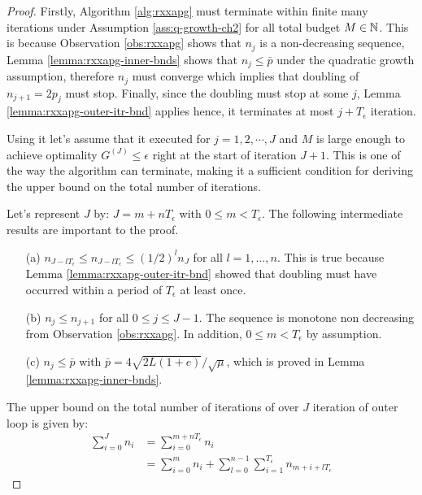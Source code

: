 \documentclass[12pt]{report}
\begin{document}
        \begin{proof}
            Firstly, Algorithm \ref{alg:rxxapg} must terminate within finite many iterations under Assumption \ref{ass:q-growth-ch2} for all total budget $M \in \mathbb N$. 
            This is because Observation \ref{obs:rxxapg} shows that $n_j$ is a non-decreasing sequence, Lemma \ref{lemma:rxxapg-inner-bnds} shows that $n_j \le \bar p$ under the quadratic growth assumption, therefore $n_j$ must converge which implies that doubling of $n_{j + 1} = 2p_{j}$ must stop. 
            Finally, since the doubling must stop at some $j$, Lemma \ref{lemma:rxxapg-outer-itr-bnd} applies hence, it terminates at most $j + T_\epsilon$ iteration. 
            \par
            Using it let's assume that it executed for $j = 1, 2, \cdots, J$ and $M$ is large enough to achieve optimality $G^{(J)} \le \epsilon$ right at the start of iteration $J + 1$.
            This is one of the way the algorithm can terminate, making it a sufficient condition for deriving the upper bound on the total number of iterations. 
            \par
            Let's represent $J$ by: $J = m + nT_\epsilon$ with $0 \le m < T_\epsilon$. 
            The following intermediate results are important to the proof. 
            \begin{enumerate}
                \item [(a)] $n_{J - lT_\epsilon} \le n_{J - lT_\epsilon}\le (1/2)^ln_J$ for all $l = 1, \ldots, n$. This is true because Lemma \ref{lemma:rxxapg-outer-itr-bnd} showed that doubling must have occurred within a period of $T_\epsilon$ at least once.
                \item [(b)] $n_{j} \le n_{j + 1}$ for all $0 \le j \le J - 1$. The sequence is monotone non decreasing from Observation \ref{obs:rxxapg}. In addition, $0 \le m < T_\epsilon$ by assumption. 
                \item [(c)] $n_j \le \bar p$ with $\bar p = 4\sqrt{2L(1 + e)}/\sqrt{\mu}$, which is proved in Lemma \ref{lemma:rxxapg-inner-bnds}. 
            \end{enumerate}
            The upper bound on the total number of iterations of \XXAPG{} over $J$ iteration of outer loop is given by: 
            \begin{align*}
                \sum_{i = 0}^{J} n_i &= \sum_{i = 0}^{m + nT_\epsilon} n_i
                \\
                &= \sum_{i = 0}^{m}n_i + \sum_{l = 0}^{n - 1}\sum_{i = 1}^{T_\epsilon} n_{m + i + lT_\epsilon}

\end{align*}
\end{proof}
\end{document}
